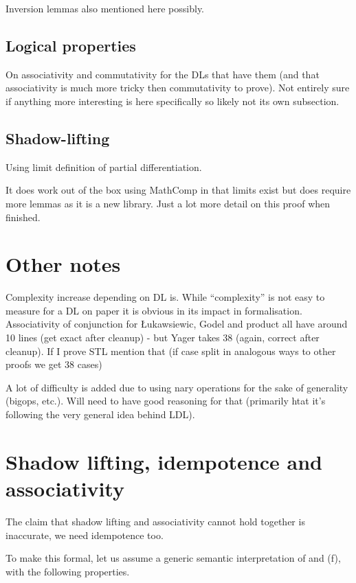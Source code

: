\documentclass[a4paper,UKenglish,cleveref, autoref, thm-restate]{lipics-v2021}
\begin{document}
Inversion lemmas also mentioned here possibly.

\subsection{Logical properties}

On associativity and commutativity for the DLs that have them (and that associativity is much more tricky then commutativity to prove). Not entirely sure if anything more interesting is here specifically so likely not its own subsection.

\subsection{Shadow-lifting}

Using limit definition of partial differentiation.

It does work out of the box using MathComp in that limits exist but does require more lemmas as it is a new library.
Just a lot more detail on this proof when finished.


\section{Other notes}

Complexity increase depending on DL is. While ``complexity'' is not easy to measure for a DL on paper it is obvious in its impact in formalisation. Associativity of conjunction for Łukawsiewic, Godel and product all have around 10 lines (get exact after cleanup) - but Yager takes 38 (again, correct after cleanup). If I prove STL mention that (if case split in analogous ways to other proofs we get 38 cases)

A lot of difficulty is added due to using nary operations for the sake of generality (bigops, etc.). Will need to have good reasoning for that (primarily htat it's following the very general idea behind LDL).


\section{Shadow lifting, idempotence and associativity}

The claim that shadow lifting and associativity cannot hold together is inaccurate, we need idempotence too.

To make this formal, let us assume a generic semantic interpretation of and (f), with the following properties.
\end{document}
